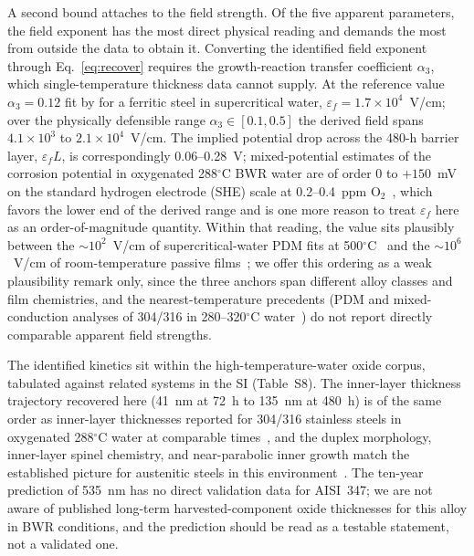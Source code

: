 \documentclass[a4paper,fleqn]{cas-sc}
\begin{document}
A second bound attaches to the field strength. Of the five apparent
parameters, the field exponent has the most direct physical reading and
demands the most from outside the data to obtain it. Converting the identified field exponent through
Eq.~\eqref{eq:recover} requires the growth-reaction transfer
coefficient $\alpha_3$, which single-temperature thickness data cannot
supply. At the reference value $\alpha_3 = 0.12$ fit by \citet{li2020scwpdm} for a ferritic steel in supercritical water,
$\varepsilon_f = 1.7\times10^4$~V/cm; over the physically defensible
range $\alpha_3 \in [0.1, 0.5]$ the derived field spans
$4.1\times10^3$ to $2.1\times10^4$~V/cm. The implied potential drop
across the 480-h barrier layer, $\varepsilon_f L$, is correspondingly
0.06--0.28~V; mixed-potential estimates of the corrosion potential in
oxygenated 288$^\circ$C BWR water are of order 0 to
$+150$~mV on the standard hydrogen electrode (SHE)
scale at 0.2--0.4~ppm
O$_2$~\citep{macdonald1992hwc,lin1996ecp}, which favors the lower end
of the derived range and is one more reason to treat $\varepsilon_f$
here as an order-of-magnitude quantity. Within that reading, the value
sits plausibly between the $\sim10^2$~V/cm of supercritical-water PDM
fits at 500$^\circ$C~\citep{li2020scwpdm} and the $\sim10^6$~V/cm of
room-temperature passive films~\citep{cabrera1949oxidation}; we offer
this ordering as a weak plausibility remark only, since the three
anchors span different alloy classes and film chemistries, and the
nearest-temperature precedents (PDM and mixed-conduction analyses of
304/316 in 280--320$^\circ$C
water~\citep{ss316l_pwr_pdm,bojinov_mcm,ss316ln_pdm2024}) do not report
directly comparable apparent field strengths.

The identified kinetics sit within the high-temperature-water oxide
corpus, tabulated against related systems in the SI (Table~S8). The inner-layer thickness
trajectory recovered here (41~nm at 72~h to 135~nm at 480~h) is of the
same order as inner-layer thicknesses reported for 304/316 stainless
steels in oxygenated 288$^\circ$C water at comparable
times~\citep{kuang2010oxidation,kim1999oxide}, and the duplex
morphology, inner-layer spinel chemistry, and near-parabolic inner
growth match the established picture for austenitic steels in this
environment~\citep{robertson1991mechanism,stellwag1998mechanism,ziemniak2002corrosion}.
The ten-year prediction of 535~nm has no direct validation data for
AISI~347; we are not aware of published long-term harvested-component
oxide thicknesses for this alloy in BWR conditions, and the prediction
should be read as a testable statement, not a validated one.
\end{document}
